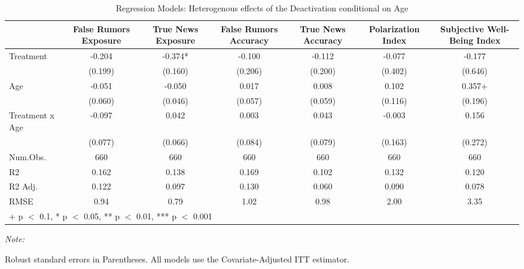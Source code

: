 \begin{table}

\caption{Regression Models: Heterogenous effects of the Deactivation conditional on Age  }
\centering
\begin{threeparttable}
\begin{tabular}[t]{lcccccc}
\toprule
  & False Rumors Exposure & True News  Exposure & False Rumors Accuracy & True News Accuracy & Polarization Index & Subjective Well-Being Index\\
\midrule
Treatment & -0.204 & -0.374* & -0.100 & -0.112 & -0.077 & -0.177\\
 & (0.199) & (0.160) & (0.206) & (0.200) & (0.402) & (0.646)\\
Age & -0.051 & -0.050 & 0.017 & 0.008 & 0.102 & 0.357+\\
 & (0.060) & (0.046) & (0.057) & (0.059) & (0.116) & (0.196)\\
Treatment x Age & -0.097 & 0.042 & 0.003 & 0.043 & -0.003 & 0.156\\
 & (0.077) & (0.066) & (0.084) & (0.079) & (0.163) & (0.272)\\
\midrule
Num.Obs. & 660 & 660 & 660 & 660 & 660 & 660\\
R2 & 0.162 & 0.138 & 0.169 & 0.102 & 0.132 & 0.120\\
R2 Adj. & 0.122 & 0.097 & 0.130 & 0.060 & 0.090 & 0.078\\
RMSE & 0.94 & 0.79 & 1.02 & 0.98 & 2.00 & 3.35\\
\bottomrule
\multicolumn{7}{l}{\rule{0pt}{1em}+ p $<$ 0.1, * p $<$ 0.05, ** p $<$ 0.01, *** p $<$ 0.001}\\
\end{tabular}
\begin{tablenotes}
\item \textit{Note: } 
\item  Robust standard errors in Parentheses. All models use the Covariate-Adjusted ITT estimator. 
\end{tablenotes}
\end{threeparttable}
\end{table}
